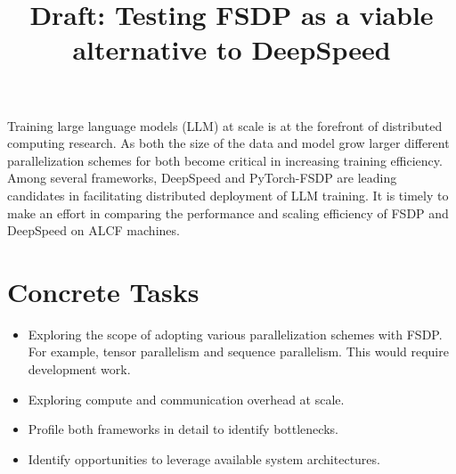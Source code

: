 \documentclass{article}
\title{Draft: Testing FSDP as a viable alternative to DeepSpeed}
\author{}
\begin{document}
\maketitle

Training large language models (LLM) at scale is at the forefront of 
distributed computing research. As both the size of the data and model grow 
larger different parallelization schemes for both become critical in increasing
training efficiency. Among several frameworks, DeepSpeed and PyTorch-FSDP are
leading candidates in facilitating distributed deployment of LLM training. It 
is timely to make an effort in comparing the performance and scaling efficiency
of FSDP and DeepSpeed on ALCF machines.

\section*{Concrete Tasks}
\begin{itemize}
    \item Exploring the scope of adopting various parallelization schemes with
        FSDP. For example, tensor parallelism and sequence parallelism. This 
        would require development work.
    \item Exploring compute and communication overhead at scale.
    \item Profile both frameworks in detail to identify bottlenecks.
    \item Identify opportunities to leverage available system architectures.
\end{itemize}
\end{document}
